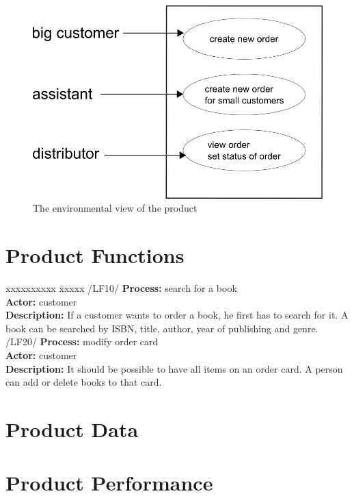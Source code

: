 \documentclass[11pt,a4paper,oneside,svgnames]{report}
\begin{document}
\begin{figure}[h!]
 \begin{center}
  \includegraphics[scale=0.8]{images/umweltdiagramm.png}
 \end{center}
 \caption{The environmental view of the product}
\end{figure}


\chapter{Product Functions}
\begin{tabbing}
    xxxxxxxxxx \= xxxxx \kill
    /LF10/ \> \textbf{Process:} search for a book\\
	\> \textbf{Actor:} customer\\ 
	\>\textbf{Description:} If a customer wants to order a book, he first has to search for it. A book can be searched by ISBN, title, author, year of publishing and genre.\\
	
	/LF20/ \> \textbf{Process:} modify order card\\
	\> \textbf{Actor:} customer\\ 
	\>\textbf{Description:} It should be possible to have all items on an order card. A person can add or delete books to that card.\\
\end{tabbing}

\chapter{Product Data}
\chapter{Product Performance}
\end{document}
